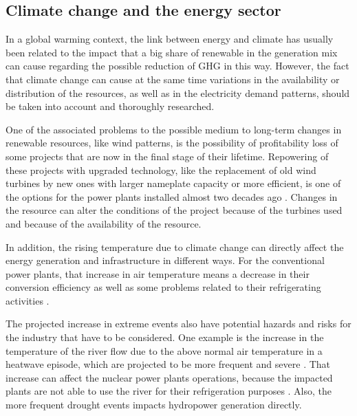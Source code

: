 
\subsection{Climate change and the energy sector}

In a global warming context, the link between energy and climate has usually been related to the impact that a big share of renewable in the generation mix can cause regarding the possible reduction of GHG in this way. However, the fact that climate change can cause at the same time variations in the availability or distribution of the resources, as well as in the electricity demand patterns, should be taken into account and thoroughly researched. 

One of the associated problems to the possible medium to long-term changes in renewable resources, like wind patterns, is the possibility of profitability loss of some projects that are now in the final stage of their lifetime. Repowering of these projects with upgraded technology, like the replacement of old wind turbines by new ones with larger nameplate capacity or more efficient, is one of the options for the power plants installed almost two decades ago \cite*{delrio}. Changes in the resource can alter the conditions of the project because of the turbines used and because of the availability of the resource.  



In addition, the rising temperature due to climate change can directly affect the energy generation and infrastructure in different ways. For the conventional power plants, that increase in air temperature means a decrease in their conversion efficiency as well as some problems related to their refrigerating activities \cite*{Bartos2015}.

The projected increase in extreme events also have potential hazards and risks for the industry that have to be considered. One example is the increase in the temperature of the river flow due to the above normal air temperature in a heatwave episode, which are projected to be more frequent and severe \cite*{Troccoli2018}. That increase can affect the nuclear power plants operations, because the impacted plants are not able to use the river for their refrigeration purposes \cite*{Troccoli2018, Fischer2010}. Also, the more frequent drought events impacts hydropower generation directly.  

